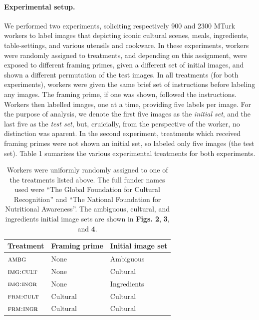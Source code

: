 \documentclass[12pt]{article}
\begin{document}
\paragraph{Experimental setup.}
We performed two experiments, soliciting respectively 900 and 2300 MTurk 
workers to
label images that depicting iconic cultural scenes, meals, ingredients, 
table-settings, and various utensils and cookware. In these experiments,
workers were randomly assigned to treatments, and depending on this 
assignment, were exposed to different framing primes, given a different 
set of initial images, and shown a different permutation of the test images. 
In all treatments (for both experiments), workers were 
given the same brief set of instructions before labeling any images.  The
framing prime, if one was shown, followed the instructions.  Workers then
labelled images, one at a time, providing five labels per image.  
For the purpose of analysis, we denote the first five images as the 
\textit{initial set}, and the last five as the \textit{test set}, but, 
cruicially, from
the perspective of the worker, no distinction was aparent.
In the second experiment, treatments which received framing primes were
not shown an initial set, so labeled only five images (the test set).
Table 1 sumarizes the various experimental treatments for both 
experiments.

\begin{table}[t]
\centering
	\begin{tabular}{ l  l  l }
		\hline                       
		Treatment & Framing prime & Initial image set	\\ 
		\hline                       
		$\textsc{ambg}$ & None & Ambiguous\\
		$\textsc{img:cult}$ & None & Cultural\\
		$\textsc{img:ingr}$ & None & Ingredients\\
		$\textsc{frm:cult}$ & Cultural & Cultural\\
		$\textsc{frm:ingr}$ & Cultural & Cultural\\
		\hline  
	\end{tabular}


	\caption{ \footnotesize{ 
		Workers were uniformly randomly assigned to one of the 
		treatments listed above. 
		The full funder names used were 
		``The Global Foundation for Cultural Recognition'' and 
		``The National Foundation for Nutritional Awareness''.  
		The ambiguous, cultural, and ingredients initial image sets are shown 
		in \textbf{Figs. 2}, \textbf{3}, and \textbf{4}.
	}}
	\label{table:1}
\end{table}
\end{document}
